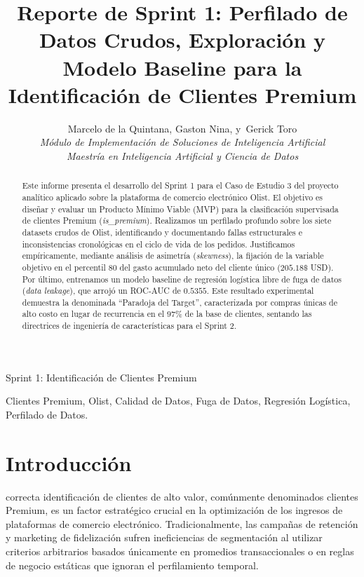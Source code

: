 \documentclass[journal,letterpaper]{IEEEtran}
\begin{document}
\title{Reporte de Sprint 1: Perfilado de Datos Crudos, Exploración y Modelo Baseline para la Identificación de Clientes Premium}

\author{Marcelo de la Quintana,
        Gaston Nina,
        y~Gerick Toro\\
        \textit{Módulo de Implementación de Soluciones de Inteligencia Artificial}\\
        \textit{Maestría en Inteligencia Artificial y Ciencia de Datos}}

%
{Sprint 1: Identificación de Clientes Premium}

\maketitle

\begin{abstract}
Este informe presenta el desarrollo del Sprint 1 para el Caso de Estudio 3 del proyecto analítico aplicado sobre la plataforma de comercio electrónico Olist. El objetivo es diseñar y evaluar un Producto Mínimo Viable (MVP) para la clasificación supervisada de clientes Premium (\textit{is\_premium}). Realizamos un perfilado profundo sobre los siete datasets crudos de Olist, identificando y documentando fallas estructurales e inconsistencias cronológicas en el ciclo de vida de los pedidos. Justificamos empíricamente, mediante análisis de asimetría (\textit{skewness}), la fijación de la variable objetivo en el percentil 80 del gasto acumulado neto del cliente único ($205.18\$$ USD). Por último, entrenamos un modelo baseline de regresión logística libre de fuga de datos (\textit{data leakage}), que arrojó un ROC-AUC de $0.5355$. Este resultado experimental demuestra la denominada ``Paradoja del Target'', caracterizada por compras únicas de alto costo en lugar de recurrencia en el $97\%$ de la base de clientes, sentando las directrices de ingeniería de características para el Sprint 2.
\end{abstract}

\begin{IEEEkeywords}
Clientes Premium, Olist, Calidad de Datos, Fuga de Datos, Regresión Logística, Perfilado de Datos.
\end{IEEEkeywords}

\section{Introducción}
 correcta identificación de clientes de alto valor, comúnmente denominados clientes Premium, es un factor estratégico crucial en la optimización de los ingresos de plataformas de comercio electrónico. Tradicionalmente, las campañas de retención y marketing de fidelización sufren ineficiencias de segmentación al utilizar criterios arbitrarios basados únicamente en promedios transaccionales o en reglas de negocio estáticas que ignoran el perfilamiento temporal.
\end{document}
